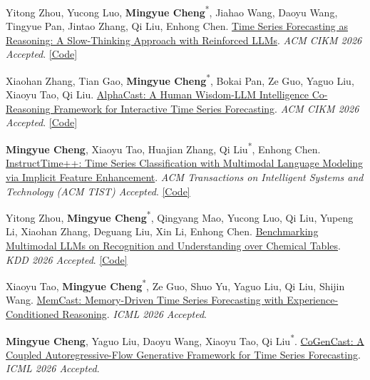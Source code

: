 \documentclass[UTF8,fontset=fandol,scheme=plain,11pt,a4paper]{ctexart}
\newcommand{\pubentry}[1]{\item \begin{minipage}[t]{\linewidth}#1\end{minipage}}
\begin{document}
\begin{publist}[start=4]
\pubentry{Yitong Zhou, Yucong Luo, \textbf{Mingyue Cheng}\textsuperscript{*}, Jiahao Wang, Daoyu Wang, Tingyue Pan, Jintao Zhang, Qi Liu, Enhong Chen. \href{https://arxiv.org/pdf/2506.10630}{Time Series Forecasting as Reasoning: A Slow-Thinking Approach with Reinforced LLMs}. \emph{ACM CIKM 2026 Accepted}. \href{https://github.com/lqzxt/Time-R1}{[Code]}}

\pubentry{Xiaohan Zhang, Tian Gao, \textbf{Mingyue Cheng}\textsuperscript{*}, Bokai Pan, Ze Guo, Yaguo Liu, Xiaoyu Tao, Qi Liu. \href{https://arxiv.org/pdf/2511.08947}{AlphaCast: A Human Wisdom-LLM Intelligence Co-Reasoning Framework for Interactive Time Series Forecasting}. \emph{ACM CIKM 2026 Accepted}. \href{https://github.com/SkyeGT/AlphaCast\_Official}{[Code]}}

\pubentry{\textbf{Mingyue Cheng}, Xiaoyu Tao, Huajian Zhang, Qi Liu\textsuperscript{*}, Enhong Chen. \href{https://arxiv.org/pdf/2601.14968}{InstructTime++: Time Series Classification with Multimodal Language Modeling via Implicit Feature Enhancement}. \emph{ACM Transactions on Intelligent Systems and Technology (ACM TIST) Accepted}. \href{https://github.com/Mingyue-Cheng/InstructTime}{[Code]}}

\pubentry{Yitong Zhou, \textbf{Mingyue Cheng}\textsuperscript{*}, Qingyang Mao, Yucong Luo, Qi Liu, Yupeng Li, Xiaohan Zhang, Deguang Liu, Xin Li, Enhong Chen. \href{https://arxiv.org/pdf/2506.11375}{Benchmarking Multimodal LLMs on Recognition and Understanding over Chemical Tables}. \emph{KDD 2026 Accepted}. \href{https://github.com/ustc-ai4science/ChemTable}{[Code]}}

\pubentry{Xiaoyu Tao, \textbf{Mingyue Cheng}\textsuperscript{*}, Ze Guo, Shuo Yu, Yaguo Liu, Qi Liu, Shijin Wang. \href{https://www.arxiv.org/pdf/2602.03164}{MemCast: Memory-Driven Time Series Forecasting with Experience-Conditioned Reasoning}. \emph{ICML 2026 Accepted}.}

\pubentry{\textbf{Mingyue Cheng}, Yaguo Liu, Daoyu Wang, Xiaoyu Tao, Qi Liu\textsuperscript{*}. \href{https://arxiv.org/pdf/2602.03564}{CoGenCast: A Coupled Autoregressive-Flow Generative Framework for Time Series Forecasting}. \emph{ICML 2026 Accepted}.}


\end{publist}
\end{document}
